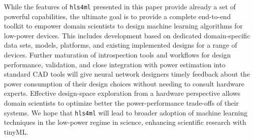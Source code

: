 \documentclass[sigconf]{acmart}
\newcommand{\hlsfml}{\texttt{hls4ml}\xspace}
\begin{document}
While the features of \hlsfml presented in this paper provide already a set of powerful capabilities, the ultimate goal is to provide a complete end-to-end toolkit to empower domain scientists to design machine learning algorithms for low-power devices.
This includes development based on dedicated domain-specific data sets, models, platforms, and existing implemented designs for a range of devices.  
Further maturation of introspection tools and workflows for design performance, validation, and close integration with power estimation into standard CAD tools will give neural network designers timely feedback about the power consumption of their design choices without needing to consult hardware experts. %
Effective design-space exploration from a hardware perspective allows domain scientists to optimize better the power-performance trade-offs of their systems.
We hope that \hlsfml will lead to broader adoption of machine learning techniques in the low-power regime in science, enhancing scientific research with tinyML.


\end{document}
